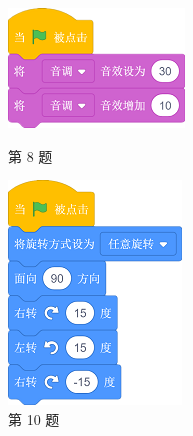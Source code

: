 \documentclass[10pt, a4paper]{article}
\begin{document}
\begin{enumerate}
        \begin{figure}[htbp]
            \begin{minipage}[t]{.24\textwidth}
                \centering
                \includegraphics[width=.7\textwidth]{8.png}
                \caption*{第 8 题}
            \end{minipage}
            \begin{minipage}[t]{.24\textwidth}
                \centering
                \includegraphics[width=.6\textwidth]{10.png}
                \caption*{第 10 题}
            \end{minipage}
            \begin{minipage}[t]{.24\textwidth}
                \centering
                \begin{minipage}[t]{.45\textwidth}

\end{minipage}
\end{minipage}
\end{figure}
\end{enumerate}
\end{document}
